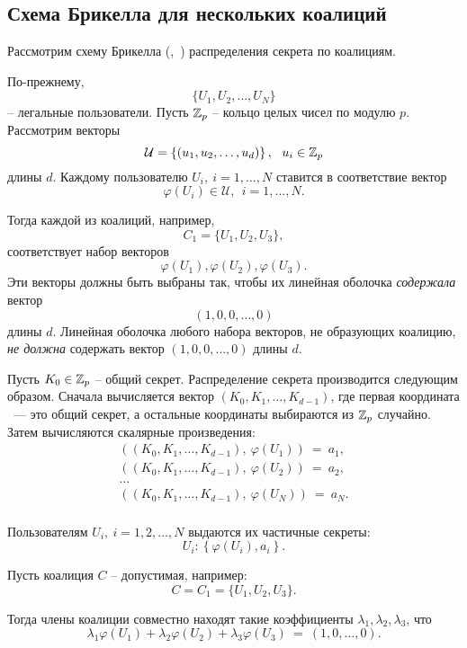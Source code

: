 \subsection{Схема Брикелла для нескольких коалиций}

Рассмотрим схему Брикелла (,~\cite{Brickell:1990}) распределения секрета по коалициям.

По-прежнему,
    \[ \{ U_1, U_2, \dots, U_N \} \]
-- легальные пользователи. Пусть $\mathbb{Z}_p$ -- кольцо целых чисел по модулю $p$. Рассмотрим векторы
    \[ \mathcal{U} = \left\{ (u_1, u_2, \dots, u_d) \right\}, ~~ u_i \in \mathbb{Z}_p \]
длины $d$. Каждому пользователю $U_i, ~ i = 1, \dots, N$ ставится в соответствие вектор
    \[ \varphi(U_i) \in \mathcal{U}, ~~ i = 1, \dots, N. \]

Тогда каждой из коалиций, например,
    \[ C_1 = \{ U_1, U_2, U_3 \}, \]
соответствует набор векторов
    \[ \varphi(U_1), \varphi(U_2), \varphi(U_3). \]
Эти векторы должны быть выбраны так, чтобы их линейная оболочка \emph{содержала} вектор
    \[ (1, 0, 0, \dots, 0) \]
длины $d$. Линейная оболочка любого набора векторов, не образующих коалицию, \emph{не должна} содержать вектор $(1, 0, 0, \dots, 0)$ длины $d$.

Пусть $K_0 \in \mathbb{Z}_p$ -- общий секрет. Распределение секрета производится следующим образом. Сначала вычисляется вектор $(K_0, K_1, \dots, K_{d-1})$, где первая координата ~--- это общий секрет, а остальные координаты выбираются из $\mathbb{Z}_p$ случайно. Затем вычисляются скалярные произведения:
\[\begin{array}{l}
	\left( \left( K_0, K_1, \dots, K_{d-1} \right), ~ \varphi(U_1) \right) ~=~ a_1, \\
	\left( \left( K_0, K_1, \dots, K_{d-1} \right), ~ \varphi(U_2) \right) ~=~ a_2, \\
	\dots \\
	\left( \left( K_0, K_1, \dots, K_{d-1} \right), ~ \varphi(U_N) \right) ~=~ a_N. \\
\end{array}\]

Пользователям $U_i, ~ i = 1, 2, \dots, N$ выдаются их частичные секреты:
    \[ U_i \colon \left\{ \varphi(U_i), a_i \right\}. \]

Пусть коалиция $C$ -- допустимая, например:
    \[ C = C_1 = \{ U_1, U_2, U_3 \}. \]

Тогда члены коалиции совместно находят такие коэффициенты $\lambda_1, \lambda_2, \lambda_3$, что
    \[ \lambda_1\varphi(U_1)+\lambda_2\varphi(U_2)+\lambda_3\varphi(U_3) ~=~ (1,0, \dots, 0). \]

